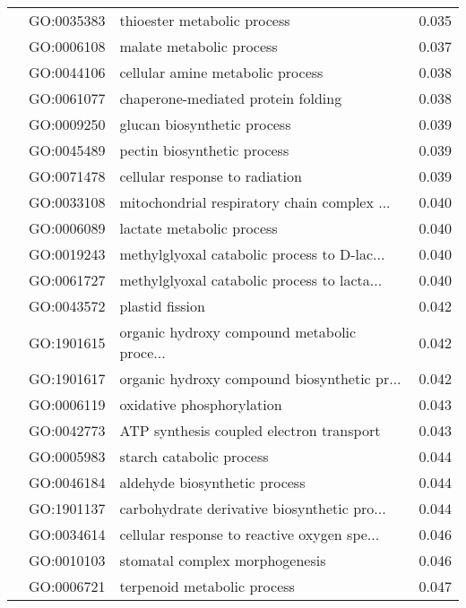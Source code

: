 \begin{longtable}{lllr}
   & GO:0035383 &                  thioester metabolic process &         0.035 \\
   & GO:0006108 &                     malate metabolic process &         0.037 \\
   & GO:0044106 &             cellular amine metabolic process &         0.038 \\
   & GO:0061077 &           chaperone-mediated protein folding &         0.038 \\
   & GO:0009250 &                  glucan biosynthetic process &         0.039 \\
   & GO:0045489 &                  pectin biosynthetic process &         0.039 \\
   & GO:0071478 &               cellular response to radiation &         0.039 \\
   & GO:0033108 &  mitochondrial respiratory chain complex ... &         0.040 \\
   & GO:0006089 &                    lactate metabolic process &         0.040 \\
   & GO:0019243 &  methylglyoxal catabolic process to D-lac... &         0.040 \\
   & GO:0061727 &  methylglyoxal catabolic process to lacta... &         0.040 \\
   & GO:0043572 &                              plastid fission &         0.042 \\
   & GO:1901615 &  organic hydroxy compound metabolic proce... &         0.042 \\
   & GO:1901617 &  organic hydroxy compound biosynthetic pr... &         0.042 \\
   & GO:0006119 &                    oxidative phosphorylation &         0.043 \\
   & GO:0042773 &     ATP synthesis coupled electron transport &         0.043 \\
   & GO:0005983 &                     starch catabolic process &         0.044 \\
   & GO:0046184 &                aldehyde biosynthetic process &         0.044 \\
   & GO:1901137 &  carbohydrate derivative biosynthetic pro... &         0.044 \\
   & GO:0034614 &  cellular response to reactive oxygen spe... &         0.046 \\
   & GO:0010103 &               stomatal complex morphogenesis &         0.046 \\
   & GO:0006721 &                  terpenoid metabolic process &         0.047 \\

\end{longtable}
